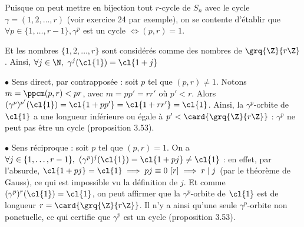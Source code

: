 Puisque on peut mettre en bijection tout $r$-cycle de $S_n$ avec le cycle $\gamma = (1,2, \ldots, r)$ (voir exercice 24 par exemple), on se contente d'établir que $\forall p \in \{1,\ldots,r-1\}, \gamma^p$ est un cycle $\iff (p,r) = 1$.

Et les nombres $\{1,2, \ldots, r\}$ sont considérés comme des nombres de $\grq{\Z}{r\Z}$. Ainsi, $\forall j\in \N,~ \gamma^j(\cl{1}) = \cl{1+j}$

$\bullet$ Sens direct, par contrapposée : soit $p$ tel que $(p,r)\neq 1$. Notons $m =\ppcm(p,r)< pr$, avec $m=pp'=rr'$ où $p'<r$. Alors $(\gamma^p)^{p'}(\cl{1}) = \cl{1+pp'} = \cl{1+rr'}=\cl{1}$. Ainsi, la $\gamma^p$-orbite de $\cl{1}$ a une longueur inférieure ou égale à $p'< \card{\grq{\Z}{r\Z} }$ : $\gamma^p$ ne peut pas être un cycle (proposition 3.53).

$\bullet$ Sens réciproque : soit $p$ tel que $(p,r)=1$. On a $\forall j\in \{1, \ldots, r-1\},~ (\gamma^p)^{j}(\cl{1}) = \cl{1+pj}\neq \cl{1}$ : en effet, par l'absurde, $\cl{1+pj}= \cl{1}\implies pj\equiv 0~ [r]\implies r\mid j$ (par le théorème de Gauss), ce qui est impossible vu la définition de $j$. Et comme $(\gamma^p)^{r}(\cl{1}) = \cl{1}$, on peut affirmer que la $\gamma^p$-orbite de $\cl{1}$ est de longueur $r = \card{\grq{\Z}{r\Z} }$. Il n'y a ainsi qu'une seule $\gamma^p$-orbite non ponctuelle, ce qui certifie que $\gamma^p$ est un cycle (proposition 3.53).
